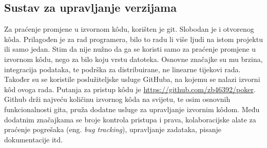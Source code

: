 \subsection{Sustav za upravljanje verzijama}
Za praćenje promjene u izvornom k\^odu, korišten je git. Slobodan je i otvorenog k\^oda. Prilagođen je za rad programera, bilo to radu li više ljudi na istom projektu ili samo jedan. Stim da nije nužno da ga se koristi samo za praćenje promjene u izvornom k\^odu, nego za bilo koju vrstu datoteka. Osnovne značajke su mu brzina, integracija podataka, te podrška za distribuirane, ne linearne tijekovi rada. Također su se koristile poslužiteljske usluge GitHuba, na kojemu se nalazi izvorni k\^od ovoga rada. Putanja za pristup k\^odu je \url{https://github.com/zb46392/poker}. Github drži najveću količinu izvornog k\^oda na svijetu, te osim osnovnih funkcionalnosti gita, pruža dodatne usluge za upravljanje izvornim k\^odom. Među dodatnim značajkama se broje kontrola pristupa i prava, kolaboracijske alate za praćenje pogrešaka (eng. \textit{bug tracking}), upravljanje zadataka, pisanje dokumentacije itd.

